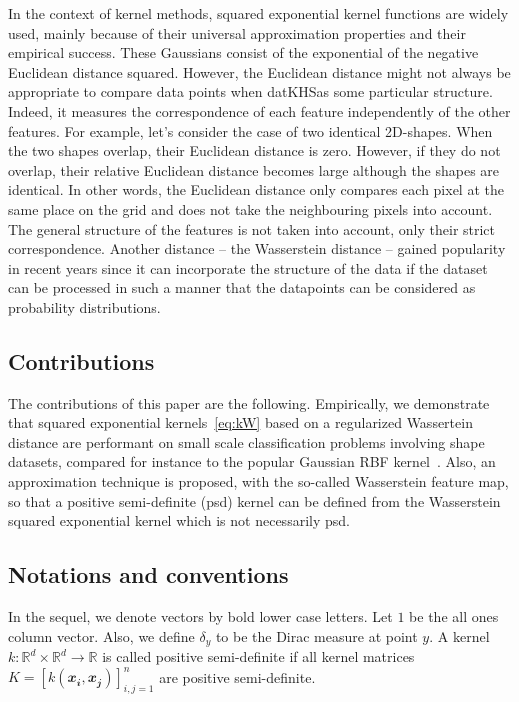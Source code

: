 In the context of kernel methods, squared exponential kernel functions are widely used, mainly because of their universal approximation properties and their empirical success. These Gaussians consist of the exponential of the negative Euclidean distance squared. However, the Euclidean distance might not always be appropriate to compare data points when datKHSas some particular structure. Indeed, it measures the correspondence of each feature independently of the other features. For example, let's consider the case of two identical 2D-shapes. When the two shapes overlap, their Euclidean distance is zero. However, if they do not overlap, their relative Euclidean distance becomes large although the shapes are identical. In other words, the Euclidean distance only compares each pixel at the same place on the grid and does not take the neighbouring pixels into account. The general structure of the features is not taken into account, only their strict correspondence.
Another distance -- the Wasserstein distance -- gained popularity in recent years since it can incorporate the structure of the data if the dataset can be processed in such a manner that the datapoints can be considered as probability distributions.
\subsection*{Contributions}
The contributions of this paper are the following. Empirically, we demonstrate that squared exponential kernels~\eqref{eq:kW} based on a regularized Wassertein distance  are performant on small scale classification problems involving shape datasets, compared for instance to the popular Gaussian RBF kernel~\cite{rasmussen:williams:2006}. Also, an approximation technique is proposed, with the so-called Wasserstein feature map, so that a positive semi-definite (psd) kernel can be defined from the Wasserstein squared exponential kernel which is not necessarily psd.
\subsection*{Notations and conventions}
In the sequel, we denote vectors by bold lower case letters. Let $\mathbfit{1}$ be the all ones column vector. Also, we define $\delta_y$  to be the Dirac measure at point $y$. A kernel $k:\mathbb{R}^d\times \mathbb{R}^d \to \mathbb{R}$ is called positive semi-definite if all kernel matrices  $K = [k(\mathbfit{x_i},\mathbfit{x_j})]_{i,j =1}^n$ are positive semi-definite.

